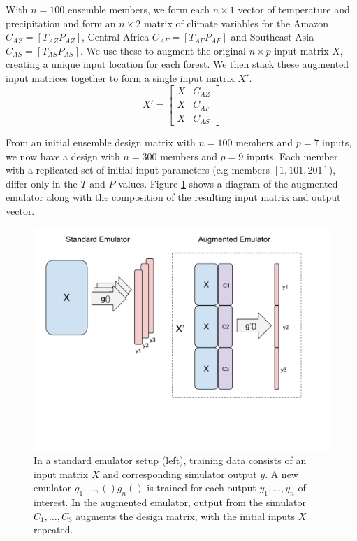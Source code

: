 \documentclass[gmd, manuscript]{copernicus}
\begin{document}
With $n = 100$ ensemble members, we form each  $n \times 1$ vector of temperature and precipitation and form an $n \times 2$  matrix of climate variables for the Amazon $C_{AZ} = [T_{AZ} P_{AZ}]$, Central Africa $C_{AF}=[T_{AF} P_{AF}]$ and Southeast Asia $C_{AS} = [T_{AS} P_{AS}]$. We use these to augment the original $n \times p$ input matrix $X$, creating a unique input location for each forest. We then stack these augmented input matrices together to form a single input matrix $X'$.
\begin{equation}
X' = \begin{bmatrix}
X & C_{AZ} \\
X & C_{AF}  \\
X & C_{AS}
\end{bmatrix}
\end{equation}

From an initial ensemble design matrix with $n=100$ members and $p=7$ inputs, we now have a design with $n=300$ members and $p=9$ inputs. Each member with a replicated set of initial input parameters (e.g members $[1, 101, 201]$), differ only in the $T$ and $P$ values. Figure \ref{fig:augmented_emulator} shows a diagram of the augmented emulator along with the composition of the resulting input matrix and output vector.

\begin{figure}[t]
\includegraphics[width=12cm]{../graphics/augmented_emulator.pdf}
\caption{In a standard emulator setup (left), training data consists of an input matrix $X$ and corresponding simulator output $y$. A new emulator $g_{1}, \ldots, ()g_{n}()$ is trained for each output $y_{1}, \ldots, y_{n}$ of interest. In the augmented emulator, output from the simulator $C_{1}, \ldots, C_{3}$ augments the design matrix, with the initial inputs $X$ repeated.}
\label{fig:augmented_emulator}
\end{figure}
\end{document}
